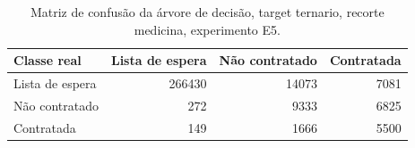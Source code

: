 \begin{table}
\caption{Matriz de confusão da árvore de decisão, target ternario, recorte medicina, experimento E5.}
\label{tab:matriz_confusao_treeClassification_19_profundidade_ternario_recorte_medicina_in_sample_e5}
\begin{tabular}{lrrr}
\toprule
Classe real & Lista de espera & Não contratado & Contratada \\
\midrule
Lista de espera & 266430 & 14073 & 7081 \\
Não contratado & 272 & 9333 & 6825 \\
Contratada & 149 & 1666 & 5500 \\
\bottomrule
\end{tabular}
\end{table}
